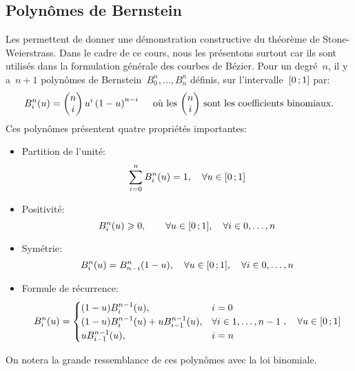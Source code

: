 \subsection{Polynômes de Bernstein} 
Les  permettent de donner une démonstration constructive du théorème de Stone-Weierstrass. Dans le cadre de ce cours, nous les présentons surtout car ils sont utilisés dans la formulation générale des courbes de Bézier. Pour un degré~$n$, il y a~$n+1$ polynômes de Bernstein~$B^n_0, \dots, B^n_n$ définis, sur l'intervalle~$\mathopen{[}0\,;1\mathclose{]}$ par: 
\begin{equation}
 B_i^n(u) = 
\begin{pmatrix} n \\ i 
\end{pmatrix} u^i \left( 1-u \right)^{n-i} \quad \text{ où les~$
\begin{pmatrix} n \\ i 
\end{pmatrix}$ sont les coefficients binomiaux.}
\end{equation}
Ces polynômes présentent quatre propriétés importantes: 
\begin{itemize}
\item Partition de l'unité:
\begin{equation}
\displaystyle\sum_{i=0}^n B_i^n(u) = 1,\quad \forall u \in \mathopen{[}0\,;1\mathclose{]}
\end{equation}
\item Positivité:
\begin{equation}
B_i^n(u)\geqslant 0,\qquad\forall u\in \mathopen{[}0\,;1\mathclose{]},\quad\forall i\in 0,\dots,n
\end{equation}
\item Symétrie:
\begin{equation}
B_i^n(u) = B_{n-i}^n(1-u), \quad \forall u \in \mathopen{[}0\,;1\mathclose{]},\quad \forall i \in 0, \dots, n
\end{equation}
\item Formule de récurrence:
\begin{equation}
B_i^n(u) = 
\begin{cases} (1-u)B_i^{n-1}(u),& i = 0\\ (1-u)B_i^{n-1}(u) + u B_{i-1}^{n-1}(u),&\forall i \in 1, \dots, n-1\\ uB_{i-1}^{n-1}(u),& i = n 
\end{cases},\quad \forall u \in \mathopen{[}0\,;1\mathclose{]}
\end{equation}
\end{itemize}
On notera la grande ressemblance de ces polynômes avec la loi binomiale. 
